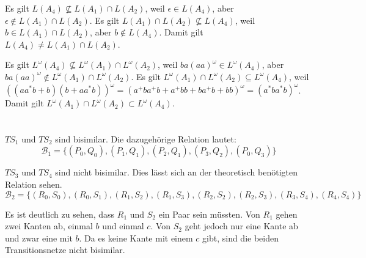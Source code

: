 \documentclass[10pt,a4paper,oneside,ngerman,numbers=noenddot]{scrartcl}
\begin{document}
		Es gilt \(L(A_{4}) \not\subseteq L(A_{1}) \cap L(A_{2})\), weil \(\epsilon \in L(A_{4})\), aber \(\epsilon \not\in L(A_{1}) \cap L(A_{2})\).
		Es gilt \(L(A_{1}) \cap L(A_{2}) \not\subseteq L(A_{4})\), weil \(b \in L(A_{1}) \cap L(A_{2})\), aber \(b \not\in L(A_{4})\). Damit gilt \(L(A_{4}) \neq L(A_{1}) \cap L(A_{2})\).
		
		Es gilt \(L^{\omega}(A_{4}) \not\subseteq L^{\omega}(A_{1}) \cap L^{\omega}(A_{2})\), weil \(ba(aa)^{\omega} \in L^{\omega}(A_{4})\), aber \(ba(aa)^{\omega} \not\in L^{\omega}(A_{1}) \cap L^{\omega}(A_{2})\).
		Es gilt \(L^{\omega}(A_{1}) \cap L^{\omega}(A_{2}) \subseteq L^{\omega}(A_{4})\), weil \(((aa^{*}b + b)(b + aa^{*}b))^{\omega} = (a^{+}ba^{+}b + a^{+}bb + ba^{+}b + bb)^{\omega} = (a^{*}ba^{*}b)^{\omega}\). Damit gilt \(L^{\omega}(A_{1}) \cap L^{\omega}(A_{2}) \subset L^{\omega}(A_{4})\).
\section{} %
	\(TS_{1}\) und \(TS_{2}\) sind bisimilar. Die dazugehörige Relation lautet:
	\[
		\mathcal{B}_{1} = \{(P_{0}, Q_{0}), (P_{1}, Q_{1}), (P_{2}, Q_{1}), (P_{3}, Q_{2}), (P_{0}, Q_{3})\}
	\]
	
	\(TS_{3}\) und \(TS_{4}\) sind nicht bisimilar. Dies lässt sich an der theoretisch benötigten Relation sehen.
	\[
		\mathcal{B}_{2} = \{(R_{0}, S_{0}), (R_{0}, S_{1}), (R_{1}, S_{2}), (R_{1}, S_{3}), (R_{2}, S_{2}), (R_{2}, S_{3}), (R_{3}, S_{4}), (R_{4}, S_{4})\}
	\]
	
	Es ist deutlich zu sehen, dass \(R_{1}\) und \(S_{2}\) ein Paar sein müssten. Von \(R_{1}\) gehen zwei Kanten ab, einmal \(b\) und einmal \(c\). Von \(S_{2}\) geht jedoch nur eine Kante ab und zwar eine mit \(b\). Da es keine Kante mit einem \(c\) gibt, sind die beiden Transitionsnetze nicht bisimilar.
\end{document}
